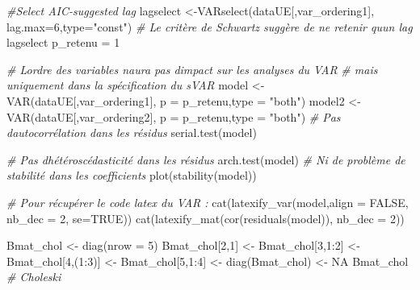 \documentclass[
  10pt,
]{article}
\newenvironment{Shaded}{\begin{snugshade}}{\end{snugshade}}
\newcommand{\AttributeTok}[1]{\textcolor[rgb]{0.77,0.63,0.00}{#1}}
\newcommand{\CommentTok}[1]{\textcolor[rgb]{0.56,0.35,0.01}{\textit{#1}}}
\newcommand{\ConstantTok}[1]{\textcolor[rgb]{0.00,0.00,0.00}{#1}}
\newcommand{\DecValTok}[1]{\textcolor[rgb]{0.00,0.00,0.81}{#1}}
\newcommand{\FunctionTok}[1]{\textcolor[rgb]{0.00,0.00,0.00}{#1}}
\newcommand{\NormalTok}[1]{#1}
\newcommand{\OtherTok}[1]{\textcolor[rgb]{0.56,0.35,0.01}{#1}}
\newcommand{\SpecialCharTok}[1]{\textcolor[rgb]{0.00,0.00,0.00}{#1}}
\newcommand{\StringTok}[1]{\textcolor[rgb]{0.31,0.60,0.02}{#1}}
\begin{document}
\begin{Shaded}
\begin{Highlighting}[]
\CommentTok{\#Select AIC{-}suggested lag}
\NormalTok{lagselect }\OtherTok{\textless{}{-}}\FunctionTok{VARselect}\NormalTok{(dataUE[,var\_ordering1],}
                      \AttributeTok{lag.max=}\DecValTok{6}\NormalTok{,}\AttributeTok{type=}\StringTok{"const"}\NormalTok{)}
\CommentTok{\# Le critère de Schwartz suggère de ne retenir qu\textquotesingle{}un lag}
\NormalTok{lagselect}
\NormalTok{p\_retenu }\OtherTok{=} \DecValTok{1}

\CommentTok{\# L\textquotesingle{}ordre des variables n\textquotesingle{}aura pas d\textquotesingle{}impact sur les analyses du VAR}
\CommentTok{\# mais uniquement dans la spécification du sVAR}
\NormalTok{model }\OtherTok{\textless{}{-}} \FunctionTok{VAR}\NormalTok{(dataUE[,var\_ordering1],}
           \AttributeTok{p =}\NormalTok{ p\_retenu,}\AttributeTok{type =} \StringTok{"both"}\NormalTok{)}
\NormalTok{model2 }\OtherTok{\textless{}{-}} \FunctionTok{VAR}\NormalTok{(dataUE[,var\_ordering2],}
             \AttributeTok{p =}\NormalTok{ p\_retenu,}\AttributeTok{type =} \StringTok{"both"}\NormalTok{)}
\CommentTok{\# Pas d\textquotesingle{}autocorrélation dans les résidus}
\FunctionTok{serial.test}\NormalTok{(model)}

\CommentTok{\# Pas d\textquotesingle{}hétéroscédasticité dans les résidus}
\FunctionTok{arch.test}\NormalTok{(model)}
\CommentTok{\# Ni de problème de stabilité dans les coefficients}
\FunctionTok{plot}\NormalTok{(}\FunctionTok{stability}\NormalTok{(model))}

\CommentTok{\# Pour récupérer le code latex du VAR :}
\FunctionTok{cat}\NormalTok{(}\FunctionTok{latexify\_var}\NormalTok{(model,}\AttributeTok{align =} \ConstantTok{FALSE}\NormalTok{, }\AttributeTok{nb\_dec =} \DecValTok{2}\NormalTok{, }\AttributeTok{se=}\ConstantTok{TRUE}\NormalTok{))}
\FunctionTok{cat}\NormalTok{(}\FunctionTok{latexify\_mat}\NormalTok{(}\FunctionTok{cor}\NormalTok{(}\FunctionTok{residuals}\NormalTok{(model)), }\AttributeTok{nb\_dec =} \DecValTok{2}\NormalTok{))}

\NormalTok{Bmat\_chol }\OtherTok{\textless{}{-}} \FunctionTok{diag}\NormalTok{(}\AttributeTok{nrow =} \DecValTok{5}\NormalTok{)}
\NormalTok{Bmat\_chol[}\DecValTok{2}\NormalTok{,}\DecValTok{1}\NormalTok{] }\OtherTok{\textless{}{-}}\NormalTok{ Bmat\_chol[}\DecValTok{3}\NormalTok{,}\DecValTok{1}\SpecialCharTok{:}\DecValTok{2}\NormalTok{] }\OtherTok{\textless{}{-}} 
\NormalTok{    Bmat\_chol[}\DecValTok{4}\NormalTok{,(}\DecValTok{1}\SpecialCharTok{:}\DecValTok{3}\NormalTok{)] }\OtherTok{\textless{}{-}}\NormalTok{ Bmat\_chol[}\DecValTok{5}\NormalTok{,}\DecValTok{1}\SpecialCharTok{:}\DecValTok{4}\NormalTok{] }\OtherTok{\textless{}{-}} 
    \FunctionTok{diag}\NormalTok{(Bmat\_chol) }\OtherTok{\textless{}{-}} \ConstantTok{NA}
\NormalTok{Bmat\_chol }\CommentTok{\# Choleski}


\end{Highlighting}
\end{Shaded}
\end{document}
